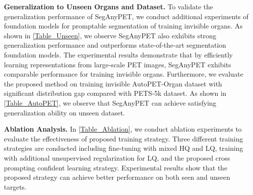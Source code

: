 \textbf{Generalization to Unseen Organs and Dataset.}
To validate the generalization performance of SegAnyPET, we conduct additional experiments of foundation models for promptable segmentation of training invisible organs. As shown in \cref{Table_Unseen}, we observe SegAnyPET also exhibits strong generalization performance and outperforms state-of-the-art segmentation foundation models. The experimental results demonstrate that by efficiently learning representations from large-scale PET images, SegAnyPET exhibits comparable performance for training invisible organs. 
Furthermore, we evaluate the proposed method on training invisible AutoPET-Organ dataset with significant distribution gap compared with PETS-5k dataset. As shown in \cref{Table_AutoPET}, we observe that SegAnyPET can achieve satisfying generalization ability on unseen dataset.

\textbf{Ablation Analysis.}
In \cref{Table_Ablation}, we conduct ablation experiments to evaluate the effectiveness of proposed training strategy. 
Three different training strategies are conducted including fine-tuning with mixed HQ and LQ, training with additional unsupervised regularization for LQ, and the proposed cross prompting confident learning strategy. Experimental results show that the proposed strategy can achieve better performance on both seen and unseen targets.

